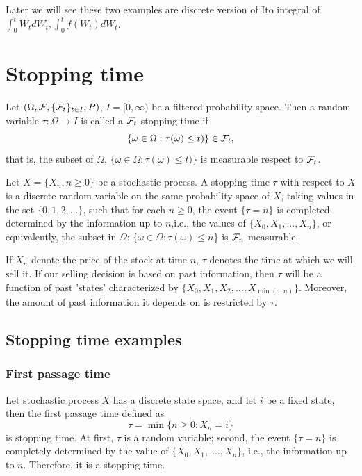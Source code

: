 \begin{refsection}
\begin{remark}
	Later we will see these two examples are discrete version of Ito integral of $\int_0^t W_t dW_t, \int_0^t f(W_t) dW_t$.
\end{remark}


\section{Stopping time}
\begin{definition} 
Let $(\Omega, \mathcal{F}, \{\mathcal{F}_t\}_{t\in I},P)$, $I=[0,\infty)$ be a filtered probability space. Then a random variable $\tau: \Omega \rightarrow I$ is called a $\mathcal{F}_t$ stopping time if $$\{\omega \in \Omega: \tau(\omega) \leq t)\}\in \mathcal{F}_t,$$
that is, the subset of $\Omega$, $\{\omega \in \Omega: \tau(\omega) \leq t)\}$ is measurable respect to $\mathcal{F}_t$.
\end{definition}

\begin{definition}\cite{Sigman2009stochastic}
Let $X=\{X_n,n\geq 0\}$ be a stochastic process. A stopping time $\tau$ with respect to $X$ is a discrete random variable on the same probability space of $X$, taking values in the set $\{0,1,2,...\}$, such that for each $n \geq 0$, the event $\{\tau = n\}$ is completed determined by the information up to $n$,i.e., the values of $\{X_0,X_1,...,X_n\}$, or equivalently, the subset in $\Omega$: $\{\omega \in \Omega: \tau(\omega) \leq n\}$ is $\mathcal{F}_n$ measurable. 
\end{definition}

\begin{remark}
If $X_n$ denote the price of the stock at time $n$, $\tau$ denotes the time at which we will sell it. If our selling decision is based on past information, then $\tau$ will be a function of past 'states' characterized by $\{X_0,X_1,X_2,...,X_{\min(\tau,n)}\}$. Moreover, the amount of past information it depends on is restricted by $\tau$.
\end{remark}

\subsection{Stopping time examples}

\subsubsection{First passage time}
\cite{Sigman2009stochastic}Let stochastic process $X$ has a discrete state space, and let $i$ be a fixed state, then the first passage time defined as
$$\tau =\min\{n\geq 0:X_n=i\}$$
is stopping time. 
At first, $\tau$ is a random variable; second, the event $\{\tau = n\}$ is completely determined by the value of $\{X_0,X_1,....,X_n\}$, i.e., the information up to $n$. Therefore, it is a stopping time.


\end{refsection}
